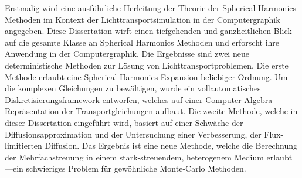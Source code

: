Erstmalig wird eine ausführliche Herleitung der Theorie der Spherical Harmonics Methoden im Kontext der Lichttransportsimulation in der Computergraphik angegeben. Diese Dissertation wirft einen tiefgehenden und ganzheitlichen Blick auf die gesamte Klasse an Spherical Harmonics Methoden und erforscht ihre Anwendung in der Computergraphik. Die Ergebnisse sind zwei neue deterministische Methoden zur Lösung von Lichttransportproblemen. Die erste Methode erlaubt eine Spherical Harmonics Expansion beliebiger Ordnung. Um die komplexen Gleichungen zu bewältigen, wurde ein vollautomatisches Diskretisierungsframework entworfen, welches auf einer Computer Algebra Repräsentation der Transportgleichungen aufbaut. Die zweite Methode, welche in dieser Dissertation eingeführt wird, basiert auf einer Schwäche der Diffusionsapproximation und der Untersuchung einer Verbesserung, der Flux-limitierten Diffusion. Das Ergebnis ist eine neue Methode, welche die Berechnung der Mehrfachstreuung in einem stark-streuendem, heterogenem Medium erlaubt---ein schwieriges Problem für gewöhnliche Monte-Carlo Methoden.
%
